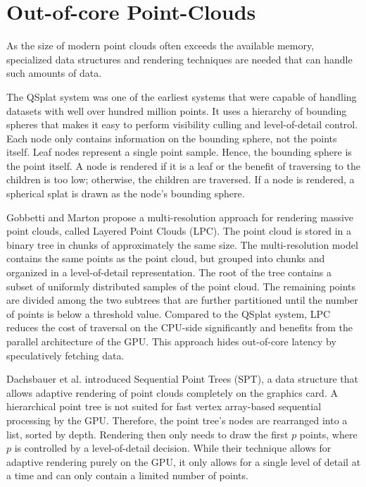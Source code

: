 \section {Out-of-core Point-Clouds}
\label{sec:related_work_point_clouds}

As the size of modern point clouds often exceeds the available memory, specialized data structures and rendering techniques are needed that can handle such amounts of data. 

The QSplat system \cite{rusinkiewicz2000qsplat} was one of the earliest systems that were capable of handling datasets with well over hundred million points. It uses a hierarchy of bounding spheres that makes it easy to perform visibility culling and level-of-detail control. Each node only contains information on the bounding sphere, not the points itself. Leaf nodes represent a single point sample. Hence, the bounding sphere is the point itself. A node is rendered if it is a leaf or the benefit of traversing to the children is too low; otherwise, the children are traversed. If a node is rendered, a spherical splat is drawn as the node's bounding sphere. 

\par

Gobbetti and Marton \cite{gobbetti2004layered} propose a multi-resolution approach for rendering massive point clouds, called Layered Point Clouds (LPC). The point cloud is stored in a binary tree in chunks of approximately the same size. The multi-resolution model contains the same points as the point cloud, but grouped into chunks and organized in a level-of-detail representation. The root of the tree contains a subset of uniformly distributed samples of the point cloud. The remaining points are divided among the two subtrees that are further partitioned until the number of points is below a threshold value. Compared to the QSplat system, LPC reduces the cost of traversal on the CPU-side significantly and benefits from the parallel architecture of the GPU. This approach hides out-of-core latency by speculatively fetching data. 

\par

Dachsbauer et al. \cite{dachsbacher2003sequential} introduced Sequential Point Trees (SPT), a data structure that allows adaptive rendering of point clouds completely on the graphics card. A hierarchical point tree is not suited for fast vertex array-based sequential processing by the GPU. Therefore, the point tree's nodes are rearranged into a list, sorted by depth. Rendering then only needs to draw the first $p$ points, where $p$ is controlled by a level-of-detail decision. While their technique allows for adaptive rendering purely on the GPU, it only allows for a single level of detail at a time and can only contain a limited number of points. 

